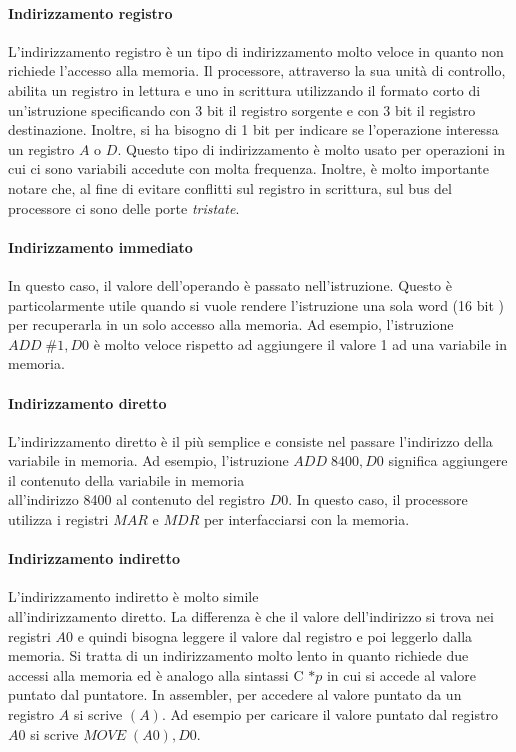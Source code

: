 \documentclass{article}
\begin{document}
\paragraph{Indirizzamento registro}
L'indirizzamento registro è un tipo di indirizzamento molto veloce in quanto 
non richiede l'accesso alla memoria. Il processore, attraverso la sua unità di 
controllo, abilita un registro in lettura e uno in scrittura utilizzando il 
formato corto di un'istruzione specificando con 3 bit il registro sorgente e
con 3 bit il registro destinazione. Inoltre, si ha bisogno di 1 bit per 
indicare se l'operazione interessa un registro $A$ o $D$. Questo tipo di
indirizzamento è molto usato per operazioni in cui ci sono variabili accedute
con molta frequenza. Inoltre, è molto importante notare che, al fine di evitare
conflitti sul registro in scrittura, sul bus del processore ci sono delle 
porte \textit{tristate}.

\paragraph{Indirizzamento immediato}
In questo caso, il valore dell'operando è passato nell'istruzione. Questo è 
particolarmente utile quando si vuole rendere l'istruzione una sola word (16 bit
) per recuperarla in un solo accesso alla memoria. Ad esempio, l'istruzione
$ADD\;\#1,D0$ è molto veloce rispetto ad aggiungere il valore 1 ad una variabile
in memoria.


\paragraph{Indirizzamento diretto}
L'indirizzamento diretto è il più semplice e consiste nel passare l'indirizzo 
della variabile in memoria. Ad esempio, l'istruzione $ADD\;8400,D0$ significa 
aggiungere il contenuto della variabile in memoria \\all'indirizzo 8400 al 
contenuto del registro $D0$. In questo caso, il processore utilizza i registri
$MAR$ e $MDR$ per interfacciarsi con la memoria.

\paragraph{Indirizzamento indiretto}
L'indirizzamento indiretto è molto simile\\ all'indirizzamento diretto. La 
differenza è che il valore dell'indirizzo si trova nei registri $A0$ e quindi 
bisogna leggere il valore dal registro e poi leggerlo dalla memoria. Si tratta 
di un indirizzamento molto lento in quanto richiede due accessi alla memoria ed 
è analogo alla sintassi C $*p$ in cui si accede al valore puntato dal puntatore. 
In assembler, per accedere al valore puntato da un registro $A$ si scrive $(A)$.
Ad esempio per caricare il valore puntato dal registro $A0$ si scrive $MOVE\;(A0)
, D0$. 
\end{document}
